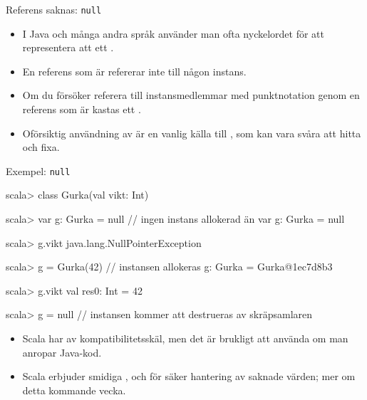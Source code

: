 
\begin{Slide}{Referens saknas: \texttt{null}}
\begin{itemize}
\item I Java och många andra språk använder man ofta nyckelordet  för att representera att ett .

\item En referens som är  refererar inte till någon instans.

\item Om du försöker referera till instansmedlemmar med punktnotation genom en referens som är  kastas ett  .

\item Oförsiktig användning av  är en vanlig källa till , som kan vara svåra att hitta och fixa.

\end{itemize}
\end{Slide}


\begin{Slide}{Exempel: \texttt{null}}
\begin{REPL}
scala> class Gurka(val vikt: Int)

scala> var g: Gurka = null        // ingen instans allokerad än
var g: Gurka = null

scala> g.vikt
java.lang.NullPointerException

scala> g = Gurka(42)          // instansen allokeras
g: Gurka = Gurka@1ec7d8b3

scala> g.vikt
val res0: Int = 42

scala> g = null         // instansen kommer att destrueras av skräpsamlaren
\end{REPL}

\begin{itemize} \SlideFontSmall
\item Scala har  av kompatibilitetsskäl, men det är brukligt att  använda  om man anropar Java-kod.

\item Scala erbjuder smidiga ,  och  för säker hantering av saknade värden; mer om detta kommande vecka.



\end{itemize}
\end{Slide}

